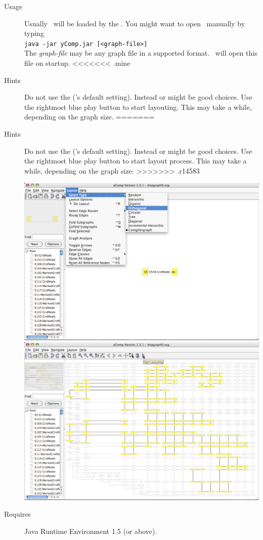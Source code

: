 \begin{description}
  \item[Usage] Usually \yComp\ will be loaded by the \GrShell. You might want to open \yComp\ manually by typing\\
   \texttt{java -jar yComp.jar [<graph-file>]}\\
  The \emph{graph-file} may be any graph file in a supported format. \yComp\ will open this file on startup.
<<<<<<< .mine
  \item[Hints] Do not use the   (\yComp's default setting). Instead \texttt{} or \texttt{} might be good choices. Use the rightmost blue play button to start layouting. This may take a while, depending on the graph size.
=======
  \item[Hints] Do not use the   (\yComp's default setting). Instead \texttt{} or \texttt{} might be good choices. Use the rightmost blue play button to start layout process. This may take a while, depending on the graph size:
>>>>>>> .r14583
\begin{center}
\includegraphics[width=0.45\linewidth]{fig/ycomp1.pdf} \includegraphics[width=0.45\linewidth]{fig/ycomp2.pdf}
\end{center}
  \item[Requires] Java Runtime Environment 1.5 (or above).
\end{description}



